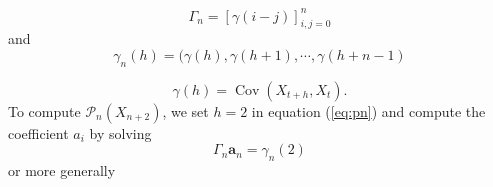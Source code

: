 \documentclass[11pt, oneside]{article}   	%
\newcommand{\Cov}{\operatorname{Cov}}
\begin{document}
 \begin{equation}
 \Gamma_{n} = [\gamma(i-j) ]_{i,j=0}^{n}
 \end{equation}
 and 
 \begin{equation}
 \gamma_{n}(h) = (\gamma(h), \gamma(h+1),\cdots,\gamma(h+n-1)
 \end{equation}
 
 \begin{equation}
 \gamma(h) = \Cov(X_{t+h},X_{t}).
 \end{equation}
 To compute $\mathcal{P}_{n}(X_{n+2})$, we set $h = 2$ in equation (\ref{eq:pn}) and compute the coefficient $a_{i}$ by solving 
 \begin{equation}
 \Gamma_{n}\textbf{a}_{n} = \gamma_{n}(2)
 \end{equation}
 or more generally
 
\end{document}
